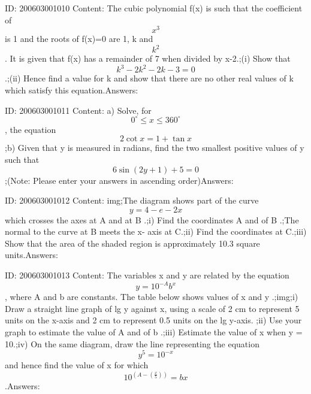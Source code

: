 \documentclass{article}
\begin{document}
ID: 200603001010
Content:
The cubic polynomial f(x) is such that the coefficient of $$x^3$$ is 1 and the roots of f(x)=0 are 1, k and $$k^2$$. It is given that f(x) has a remainder of 7 when divided by x-2.;(i)	Show that $$k^3-2k^2-2k-3=0$$.;(ii)	Hence find a value for k and show that there are no other real values of k which satisfy this equation.Answers:

ID: 200603001011
Content:
a)	Solve, for $$0^{\circ}\leq x\leq360^{\circ}$$, the equation $$2 \cot x =1 + \tan  x$$;b)	Given that y is measured in radians, find the two smallest positive values of y such that $$6 \sin  (2y + 1) + 5 = 0$$;(Note: Please enter your answers in ascending order)Answers:

ID: 200603001012
Content:
img;The diagram shows part of the curve $$y = 4 - e-2x$$ which crosses the axes at A and at B .;i) Find the coordinates A and of B .;The normal to the curve at B meets the x- axis at C.;ii) Find the coordinates at C.;iii) Show that the area of the shaded region is approximately 10.3 square units.Answers:

ID: 200603001013
Content:
The variables x and y are related by the equation $$y=10^{-A}b^x$$, where A and b are constants. The table below shows values of x and y .;img;i) Draw a straight line graph of lg y against x, using a scale of 2 cm to represent 5 units on the x-axis and 2 cm to represent 0.5 units on the lg y-axis. ;ii) Use your graph to estimate the value of A and of b .;iii) Estimate the value of x when y = 10.;iv) On the same diagram, draw the line representing the equation $$y^5=10^{-x}$$and hence find the value of x for which $$10^{(A-( \frac{x}{5}))}=bx$$.Answers:
\end{document}
